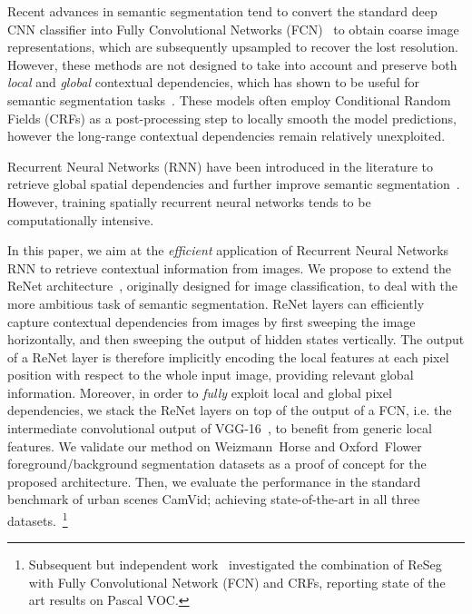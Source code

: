 \documentclass[times,art10,twocolumn,latex8]{article}
\begin{document}
Recent advances in semantic segmentation tend to convert the standard deep
CNN classifier into Fully Convolutional Networks
(FCN)~\cite{long2014fully,noh2015learning,badrinarayanan2015segnet,
Ronneberger2015} to obtain coarse image representations, which are subsequently
upsampled to recover the lost resolution. However, these methods are not
designed to take into account and preserve both \emph{local} and \emph{global} contextual dependencies,
which has shown to be useful for semantic segmentation
tasks~\cite{Singh2013,Gatta14-deepvision}.
These models often employ Conditional Random Fields (CRFs) as a
post-processing step to locally smooth the model predictions, however the
long-range contextual dependencies remain relatively unexploited.

Recurrent Neural Networks (RNN) have been introduced in the literature to
retrieve global spatial dependencies and further improve semantic
segmentation~\cite{Pinheiro:2014, Gatta14-deepvision, chen2015semantic,
byeon2015scene}. However, training spatially recurrent neural networks tends to
be computationally intensive.


In this paper, we aim at the {\em efficient} application of Recurrent Neural
Networks RNN to retrieve contextual information from images. We propose to
extend the ReNet architecture~\cite{visin2015renet}, originally designed for
image classification, to deal with the more ambitious task of semantic
segmentation. ReNet layers can efficiently capture contextual dependencies from
images by first sweeping the image horizontally, and then sweeping the output
of hidden states vertically.  The output of a ReNet layer is therefore
implicitly encoding the local features at each pixel position with respect to
the whole input image, providing relevant global information. Moreover, in
order to {\em fully} exploit local and global pixel dependencies, we stack the
ReNet layers on top of the output of a FCN, i.e. the intermediate convolutional
output of VGG-16~\cite{Simonyan2015}, to benefit from generic local features.
We validate our method on Weizmann~Horse and Oxford~Flower
foreground/background segmentation datasets as a proof of concept for the
proposed architecture.  Then, we evaluate the performance in the standard
benchmark of urban scenes CamVid; achieving state-of-the-art in all three
datasets.~\footnote{Subsequent but independent
work~\cite{DBLP:journals/corr/YanZJBY16} investigated the combination of ReSeg
with Fully Convolutional Network (FCN) and CRFs, reporting state of the art
results on Pascal VOC.}
\end{document}

